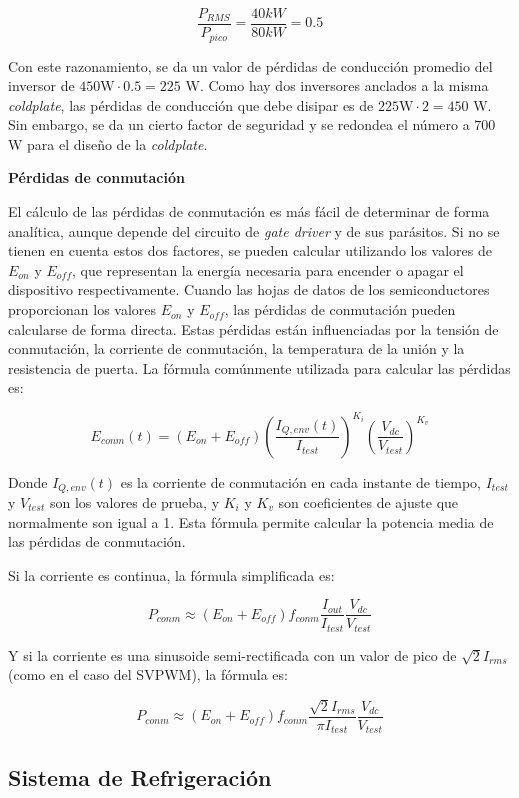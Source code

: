 \[
\frac{P_{RMS}}{P_{pico}} = \frac{40 kW}{80 kW} = 0.5
\]

Con este razonamiento, se da un valor de pérdidas de conducción promedio del inversor de $450 \text{W} \cdot 0.5 = 225$ W. Como hay dos inversores anclados a la misma \textit{coldplate}, las pérdidas de conducción que debe disipar es de $225 \text{W} \cdot 2 = 450$ W. Sin embargo, se da un cierto factor de seguridad y se redondea el número a $700$ W para el diseño de la \textit{coldplate}.


\textbf{Pérdidas de conmutación}

El cálculo de las pérdidas de conmutación es más fácil de determinar de forma analítica, aunque depende del circuito de \textit{gate driver} y de sus parásitos. Si no se tienen en cuenta estos dos factores, se pueden calcular utilizando los valores de \(E_{on}\) y \(E_{off}\), que representan la energía necesaria para encender o apagar el dispositivo respectivamente. Cuando las hojas de datos de los semiconductores proporcionan los valores \(E_{on}\) y \(E_{off}\), las pérdidas de conmutación pueden calcularse de forma directa. Estas pérdidas están influenciadas por la tensión de conmutación, la corriente de conmutación, la temperatura de la unión y la resistencia de puerta. La fórmula comúnmente utilizada para calcular las pérdidas es:

\[
E_{conm}(t) = (E_{on} + E_{off}) \left( \frac{I_{Q,env}(t)}{I_{test}} \right)^{K_i} \left( \frac{V_{dc}}{V_{test}} \right)^{K_v}
\]

Donde \(I_{Q,env}(t)\) es la corriente de conmutación en cada instante de tiempo, \(I_{test}\) y \(V_{test}\) son los valores de prueba, y \(K_i\) y \(K_v\) son coeficientes de ajuste que normalmente son igual a 1. Esta fórmula permite calcular la potencia media de las pérdidas de conmutación.

Si la corriente es continua, la fórmula simplificada es:

\[
P_{conm} \approx (E_{on} + E_{off}) f_{conm} \frac{I_{out}}{I_{test}} \frac{V_{dc}}{V_{test}}
\]

Y si la corriente es una sinusoide semi-rectificada con un valor de pico de \(\sqrt{2} I_{rms}\) (como en el caso del SVPWM), la fórmula es:

\[
P_{conm} \approx (E_{on} + E_{off}) f_{conm} \frac{\sqrt{2} I_{rms}}{\pi I_{test}} \frac{V_{dc}}{V_{test}}
\]


\subsection{Sistema de Refrigeración}

